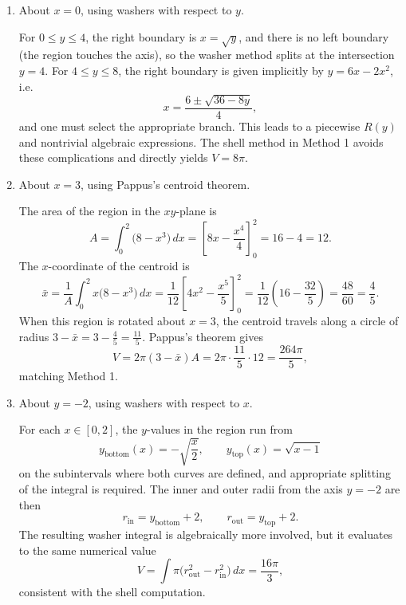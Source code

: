 \documentclass[12pt]{article}
\begin{document}
\begin{enumerate}[label=(\alph*)]
\item About \(x=0\), using washers with respect to \(y\).

For \(0\le y\le 4\), the right boundary is \(x=\sqrt{y}\), and there is no left boundary (the region touches the axis), so the washer method splits at the intersection \(y=4\). For \(4\le y\le 8\), the right boundary is given implicitly by \(y=6x-2x^{2}\), i.e.
\[
x=\frac{6\pm\sqrt{36-8y}}{4},
\]
and one must select the appropriate branch. This leads to a piecewise \(R(y)\) and nontrivial algebraic expressions. The shell method in Method 1 avoids these complications and directly yields \(V=8\pi\).

\item About \(x=3\), using Pappus's centroid theorem.

The area of the region in the \(xy\)-plane is
\[
A=\int_{0}^{2}\big(8-x^{3}\big)\,dx
=\left[8x-\frac{x^{4}}{4}\right]_{0}^{2}
=16-4=12.
\]
The \(x\)-coordinate of the centroid is
\[
\bar{x}
=\frac{1}{A}\int_{0}^{2}x\big(8-x^{3}\big)\,dx
=\frac{1}{12}\left[4x^{2}-\frac{x^{5}}{5}\right]_{0}^{2}
=\frac{1}{12}\left(16-\frac{32}{5}\right)
=\frac{48}{60}
=\frac{4}{5}.
\]
When this region is rotated about \(x=3\), the centroid travels along a circle of radius \(3-\bar{x}=3-\frac{4}{5}=\frac{11}{5}\). Pappus's theorem gives
\[
V = 2\pi(3-\bar{x})A
=2\pi\cdot\frac{11}{5}\cdot 12
=\frac{264\pi}{5},
\]
matching Method 1.

\item About \(y=-2\), using washers with respect to \(x\).

For each \(x\in[0,2]\), the \(y\)-values in the region run from
\[
y_{\text{bottom}}(x)=-\sqrt{\frac{x}{2}},\qquad
y_{\text{top}}(x)=\sqrt{x-1}
\]
on the subintervals where both curves are defined, and appropriate splitting of the integral is required. The inner and outer radii from the axis \(y=-2\) are then
\[
r_{\text{in}}=y_{\text{bottom}}+2,\qquad
r_{\text{out}}=y_{\text{top}}+2.
\]
The resulting washer integral is algebraically more involved, but it evaluates to the same numerical value
\[
V = \int \pi\big(r_{\text{out}}^{2}-r_{\text{in}}^{2}\big)\,dx
= \frac{16\pi}{3},
\]
consistent with the shell computation.
\end{enumerate}

\newpage

\end{document}
